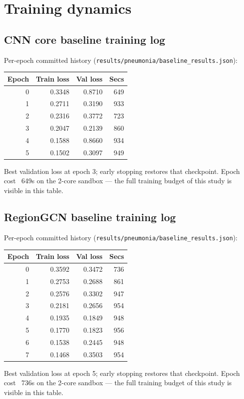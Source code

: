 
\section{Training dynamics}

\subsection{CNN core baseline training log}
Per-epoch committed history (\texttt{results/pneumonia/baseline\_results.json}):
\begin{tabular}{rrrr}
\hline Epoch & Train loss & Val loss & Secs \\ \hline
0 & 0.3348 & 0.8710 & 649 \\
1 & 0.2711 & 0.3190 & 933 \\
2 & 0.2316 & 0.3772 & 723 \\
3 & 0.2047 & 0.2139 & 860 \\
4 & 0.1588 & 0.8660 & 934 \\
5 & 0.1502 & 0.3097 & 949 \\
\hline
\end{tabular}
Best validation loss at epoch 3; early stopping restores that
checkpoint. Epoch cost ~649s on the 2-core sandbox ---
the full training budget of this study is visible in this table.


\subsection{RegionGCN baseline training log}
Per-epoch committed history (\texttt{results/pneumonia/baseline\_results.json}):
\begin{tabular}{rrrr}
\hline Epoch & Train loss & Val loss & Secs \\ \hline
0 & 0.3592 & 0.3472 & 736 \\
1 & 0.2753 & 0.2688 & 861 \\
2 & 0.2576 & 0.3302 & 947 \\
3 & 0.2181 & 0.2656 & 954 \\
4 & 0.1935 & 0.1849 & 948 \\
5 & 0.1770 & 0.1823 & 956 \\
6 & 0.1538 & 0.2445 & 948 \\
7 & 0.1468 & 0.3503 & 954 \\
\hline
\end{tabular}
Best validation loss at epoch 5; early stopping restores that
checkpoint. Epoch cost ~736s on the 2-core sandbox ---
the full training budget of this study is visible in this table.

